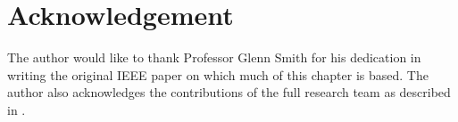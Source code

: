 \section{Acknowledgement}
The author would like to thank Professor Glenn Smith for his dedication in writing the original IEEE paper \cite{RECAP} on which much of this chapter is based.  The author also acknowledges the contributions of the full research team as described in \cite{MaloneySmithAntChapters}.

\FloatBarrier






